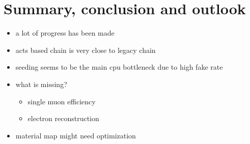 \section{Summary, conclusion and outlook}

\begin{itemize}
    \color{red}
    \item a lot of progress has been made
    \item acts based chain is very close to legacy chain
    \item seeding seems to be the main cpu bottleneck due to high fake rate
    \item what is missing?
    \begin{itemize}
        \item single muon efficiency
        \item electron reconstruction
    \end{itemize}
    \item material map might need optimization
\end{itemize}
